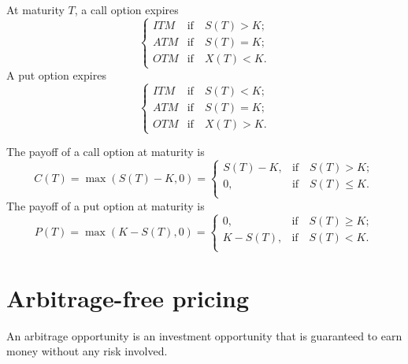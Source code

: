 At maturity $ T $, a call option expires
\begin{equation*}
    \begin{cases}
        ITM & \text{if} \quad S(T) > K; \\
        ATM & \text{if} \quad S(T) = K; \\
        OTM & \text{if} \quad X(T) < K.
    \end{cases}
\end{equation*}
A put option expires
\begin{equation*}
    \begin{cases}
        ITM & \text{if} \quad S(T) < K; \\
        ATM & \text{if} \quad S(T) = K; \\
        OTM & \text{if} \quad X(T) > K.
    \end{cases}
\end{equation*}

The payoff of a call option at maturity is
\begin{equation*}
    C(T) = \max (S(T) - K, 0) =
    \begin{cases}
        S(T) - K, & \text{if} \quad S(T) > K; \\
        0, & \text{if} \quad S(T) \leq K. \\
    \end{cases}
\end{equation*}
The payoff of a put option at maturity is
\begin{equation*}
    P(T) = \max (K - S(T), 0) =
    \begin{cases}
        0, & \text{if} \quad S(T) \geq K; \\
        K - S(T), & \text{if} \quad S(T) < K. \\
    \end{cases}
\end{equation*}

\section{Arbitrage-free pricing}
An arbitrage opportunity is an investment opportunity that is guaranteed to earn
    money without any risk involved.

